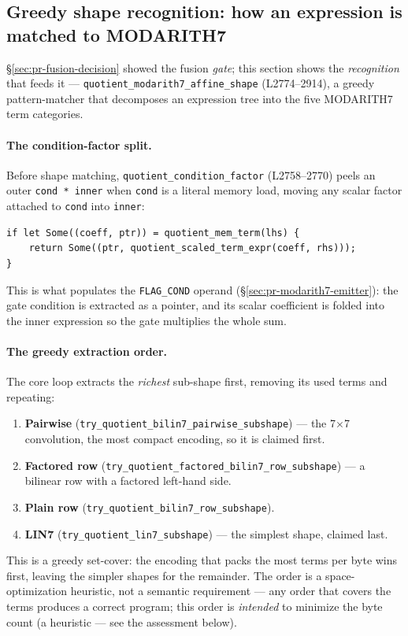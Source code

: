 \subsection{Greedy shape recognition: how an expression is matched to MODARITH7}
\label{sec:pr-shape-recognition}

§\ref{sec:pr-fusion-decision} showed the fusion \emph{gate};
this section shows the \emph{recognition} that feeds it ---
\texttt{quotient\_\allowbreak{}modarith7\_\allowbreak{}affine\_\allowbreak{}shape} (L2774--2914), a
greedy pattern-matcher that decomposes an expression tree into the
five MODARITH7 term categories.

\paragraph{The condition-factor split.}
Before shape matching, \texttt{quotient\_\allowbreak{}condition\_\allowbreak{}factor}
(L2758--2770) peels an outer \texttt{cond * inner} when
\texttt{cond} is a literal memory load, moving any scalar factor
attached to \texttt{cond} into \texttt{inner}:
\begin{lstlisting}[style=rust]
if let Some((coeff, ptr)) = quotient_mem_term(lhs) {
    return Some((ptr, quotient_scaled_term_expr(coeff, rhs)));
}
\end{lstlisting}
This is what populates the \texttt{FLAG\_COND} operand
(§\ref{sec:pr-modarith7-emitter}): the gate condition is
extracted as a pointer, and its scalar coefficient is folded into
the inner expression so the gate multiplies the whole sum.

\paragraph{The greedy extraction order.}
The core loop extracts the \emph{richest} sub-shape first,
removing its used terms and repeating:
\begin{enumerate}[leftmargin=1.6em,itemsep=2pt]
\item \textbf{Pairwise} (\texttt{try\_\allowbreak{}quotient\_\allowbreak{}bilin7\_\allowbreak{}pairwise\_\allowbreak{}subshape})
  --- the 7$\times$7 convolution, the most compact encoding, so
  it is claimed first.
\item \textbf{Factored row} (\texttt{try\_\allowbreak{}quotient\_\allowbreak{}factored\_\allowbreak{}bilin7\_\allowbreak{}row\_\allowbreak{}subshape})
  --- a bilinear row with a factored left-hand side.
\item \textbf{Plain row} (\texttt{try\_\allowbreak{}quotient\_\allowbreak{}bilin7\_\allowbreak{}row\_\allowbreak{}subshape}).
\item \textbf{LIN7} (\texttt{try\_\allowbreak{}quotient\_\allowbreak{}lin7\_\allowbreak{}subshape})
  --- the simplest shape, claimed last.
\end{enumerate}
This is a greedy set-cover: the encoding that packs the most terms
per byte wins first, leaving the simpler shapes for the remainder.
The order is a space-optimization heuristic, not a semantic
requirement --- any order that covers the terms produces a correct
program; this order is \emph{intended} to minimize the byte
count (a heuristic --- see the assessment below).


